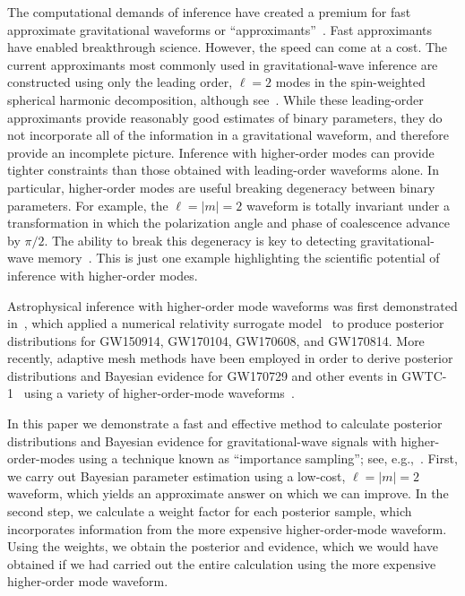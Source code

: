 \documentclass[prd,superscriptaddress,twocolumn,nopreprintnumbers,floatfix,longbibliography]{revtex4}
\begin{document}
The computational demands of inference have created a premium for fast approximate gravitational waveforms or ``approximants''~\cite{IMRPhenomPv2,SEOBNRv2}.
Fast approximants have enabled breakthrough science.
However, the speed can come at a cost.
The current approximants most commonly used in gravitational-wave inference are constructed using only the leading order, $\ell=2$ modes in the spin-weighted spherical harmonic decomposition, although see~\cite{IMRPhenomHM}.
While these leading-order approximants provide reasonably good estimates of binary parameters, they do not incorporate all of the information in a gravitational waveform, and therefore provide an incomplete picture.
Inference with higher-order modes can provide tighter constraints than those obtained with leading-order waveforms alone.
In particular, higher-order modes are useful breaking degeneracy between binary parameters.
For example, the $\ell=|m|=2$ waveform is totally invariant under a transformation in which the polarization angle and phase of coalescence advance by $\pi/2$.
The ability to break this degeneracy is key to detecting gravitational-wave memory~\cite{memory}.
This is just one example highlighting the scientific potential of inference with higher-order modes.

Astrophysical inference with higher-order mode waveforms was first demonstrated in~\cite{Kumar,RapidPE2}, which applied a numerical relativity surrogate model~\cite{NRSur7dq2} to produce posterior distributions for GW150914, GW170104, GW170608, and GW170814.
More recently, adaptive mesh methods have been employed in order to derive posterior distributions and Bayesian evidence for GW170729 and other events in GWTC-1~\cite{gwtc-1} using a variety of higher-order-mode waveforms~\cite{Chatziioannou}.

In this paper we demonstrate a fast and effective method to calculate posterior distributions and Bayesian evidence for gravitational-wave signals with higher-order-modes using a technique known as ``importance sampling''; see, e.g.,~\cite{Robert&Casella,Liu}.
First, we carry out Bayesian parameter estimation using a low-cost, $\ell=|m|=2$ waveform, which yields an approximate answer on which we can improve.
In the second step, we calculate a weight factor for each posterior sample, which incorporates information from the more expensive higher-order-mode waveform.
Using the weights, we obtain the posterior and evidence, which we would have obtained if we had carried out the entire calculation using the more expensive higher-order mode waveform.
\end{document}
